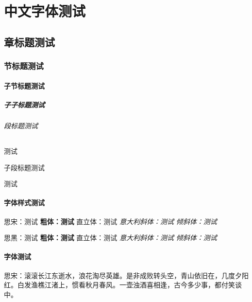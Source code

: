 \documentclass{../../PublicResources/DocClass}
\begin{document}
    \maketitle
    \frontmatter
    \clearpage
    
    \clearpage
    {\centering \tableofcontents} %
    \mainmatter

    \part{中文字体测试}
    \chapter{章标题测试}
    \section{节标题测试}
    \subsection{子节标题测试}
    \subsubsection{子子标题测试}
    \paragraph{段标题测试}
    测试
    \subparagraph{子段标题测试}
    测试

    \subsection{字体样式测试}
    {\rmfamily 思宋：测试 \textbf{粗体：测试} \textup{直立体：测试} \textit{意大利斜体：测试} \textsl{倾斜体：测试}}

    {\sffamily 思黑：测试 \textbf{粗体：测试} \textup{直立体：测试} \textit{意大利斜体：测试} \textsl{倾斜体：测试}}

    \subsection{字体测试}
    {\rmfamily 思宋：滚滚长江东逝水，浪花淘尽英雄。是非成败转头空，青山依旧在，几度夕阳红。白发渔樵江渚上，惯看秋月春风。一壶浊酒喜相逢，古今多少事，都付笑谈中。}
\end{document}
